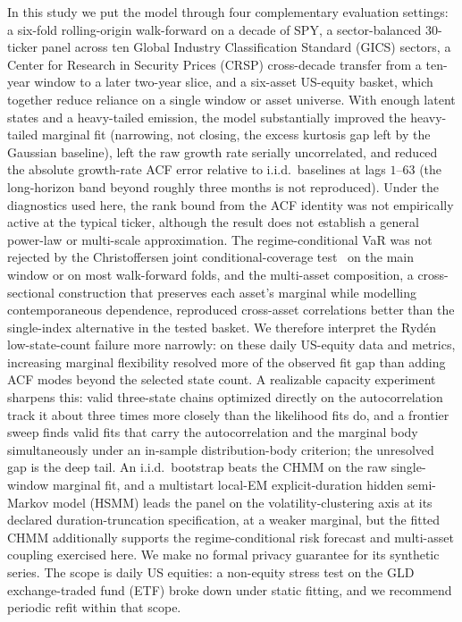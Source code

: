 In this study we put the model through four complementary evaluation settings: a six-fold rolling-origin walk-forward on a decade of SPY, a sector-balanced 30-ticker panel across ten Global Industry Classification Standard (GICS) sectors, a Center for Research in Security Prices (CRSP) cross-decade transfer from a ten-year window to a later two-year slice, and a six-asset US-equity basket, which together reduce reliance on a single window or asset universe. With enough latent states and a heavy-tailed emission, the model substantially improved the heavy-tailed marginal fit (narrowing, not closing, the excess kurtosis gap left by the Gaussian baseline), left the raw growth rate serially uncorrelated, and reduced the absolute growth-rate ACF error relative to i.i.d.\ baselines at lags $1$--$63$ (the long-horizon band beyond roughly three months is not reproduced). Under the diagnostics used here, the rank bound from the ACF identity was not empirically active at the typical ticker, although the result does not establish a general power-law or multi-scale approximation. The regime-conditional VaR was not rejected by the Christoffersen joint conditional-coverage test~\cite{christoffersen1998evaluating} on the main window or on most walk-forward folds, and the multi-asset composition, a cross-sectional construction that preserves each asset's marginal while modelling contemporaneous dependence, reproduced cross-asset correlations better than the single-index alternative in the tested basket. We therefore interpret the Ryd\'{e}n low-state-count failure more narrowly: on these daily US-equity data and metrics, increasing marginal flexibility resolved more of the observed fit gap than adding ACF modes beyond the selected state count. A realizable capacity experiment sharpens this: valid three-state chains optimized directly on the autocorrelation track it about three times more closely than the likelihood fits do, and a frontier sweep finds valid fits that carry the autocorrelation and the marginal body simultaneously under an in-sample distribution-body criterion; the unresolved gap is the deep tail. An i.i.d.\ bootstrap beats the CHMM on the raw single-window marginal fit, and a multistart local-EM explicit-duration hidden semi-Markov model (HSMM) leads the panel on the volatility-clustering axis at its declared duration-truncation specification, at a weaker marginal, but the fitted CHMM additionally supports the regime-conditional risk forecast and multi-asset coupling exercised here. We make no formal privacy guarantee for its synthetic series. The scope is daily US equities: a non-equity stress test on the GLD exchange-traded fund (ETF) broke down under static fitting, and we recommend periodic refit within that scope.
